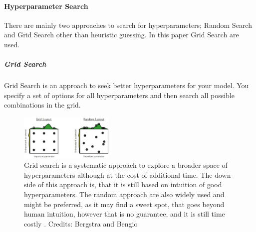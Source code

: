 \paragraph{Hyperparameter Search}

There are mainly two approaches to search for hyperparameters; Random Search and Grid Search other than heuristic guessing. In this paper Grid Search are used.

\subparagraph{Grid Search}

Grid Search is an approach to seek better hyperparameters for your model. You specify a set of options for all hyperparameters and then search all possible combinations in the grid. 

\begin{figure}[H]
    \centering
    \includegraphics[width=0.4\textwidth]{figures/gridsearch_vs_randomsearch.jpeg}
    \caption[]{Grid search is a systematic approach to explore a broader space of hyperparameters although at the cost of additional time. The down-side of this approach is, that it is still based on intuition of good hyperparameters. The random approach are also widely used and might be preferred, as it may find a sweet spot, that goes beyond human intuition, however that is no guarantee, and it is still time costly \cite{Bergstra}. Credits: Bergstra and Bengio}
    \label{fig:gs_vs_rs}
\end{figure}

  
